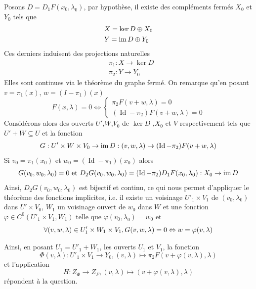 \documentclass[memoire.tex]{subfiles}
\begin{document}
\begin{preuve}
    Posons $D=D_1F(x_0,\lambda_0)$,
    par hypothèse, il existe des compléments fermés $X_0$  et $Y_0$ tels que
    \begin{align*}
        &X=\ker D\oplus X_0\\
        &Y=\operatorname{im} D \oplus Y_0
    \end{align*}
    Ces derniers induisent des projections naturelles
    \begin{align*}
        &\pi_1 : X\rightarrow \ker D\\
        &\pi_2 : Y\rightarrow Y_0
    \end{align*}
    Elles sont continues via le théorème du graphe fermé.
    On remarque qu'en posant $v=\pi_1(x)$, $w=(I-\pi_1)(x)$
    \begin{equation} \label{SysteLP}
        F(x, \lambda) = 0 \iff 
\begin{cases}
    \pi_2 F(v+w,\lambda) = 0 \\ 
    (\operatorname*{Id} - \pi_2) F(v+w,\lambda) = 0 
\end{cases}
    \end{equation}
Considérons alors des ouverts $U'$,$W$,$V_0$  de $\ker D$ ,$X_0$ et $V$ respectivement tels que 
$U'+W\subseteq U$ et la fonction 
\begin{eqnarray}\label{dépliage}
    G: U'\times W\times V_0\rightarrow \operatorname{im} D: (v,w,\lambda)\mapsto (\operatorname*{Id}-\pi_2) 
    F(v+w,\lambda)
\end{eqnarray}
Si $v_0=\pi_1(x_0)$ et $w_0=(\operatorname{Id}-\pi_1)(x_0)$ alors
\begin{equation*}
    G(v_0,w_0,\lambda_0)=0\text{ et } D_2G(v_0,w_0,\lambda_0)= (\operatorname*{Id}-\pi_2) D_1  F (x_0,\lambda_0): X_0\rightarrow \operatorname{im} D
\end{equation*}
Ainsi,  $D_2G(v_0,w_0,\lambda_0)$ est bijectif et continu, ce qui nous permet d'appliquer le théorème des fonctions implicites, i.e. il existe un voisinage $U'_1\times V_1$ de $(v_0,\lambda_0)$ dans $U'\times V_0$, $W_1$ un voisinage ouvert de $w_0$ dans $W$ et une fonction $\varphi\in C^0(U'_1\times V_1,W_1)$ telle que $\varphi(v_0,\lambda_0)=w_0$ et 
\begin{equation*}
    \forall (v,w,\lambda)\in U'_1\times W_1\times V_1,\space G(v,w,\lambda)=0\Leftrightarrow w = \varphi(v,\lambda)
\end{equation*}

Ainsi, en posant $U_1=U'_1+W_1$, les ouverts $U_1$ et $V_1$, la fonction
\begin{equation}\label{fonctionproj}
    \Phi(v,\lambda): U'_1\times V_1\rightarrow Y_0, (v,\lambda)\mapsto \pi_2 F(v+\varphi(v,\lambda),\lambda)
\end{equation}
et l'application
\begin{equation*}
    H: Z_{\Phi}\rightarrow Z_F, (v,\lambda)\mapsto (v+\varphi(v,\lambda),\lambda)
\end{equation*}
répondent à la question.
\end{preuve}
\end{document}
